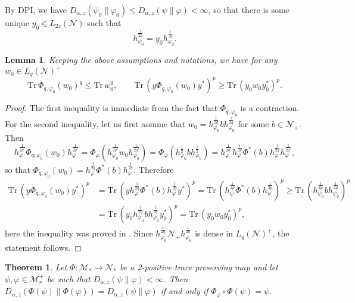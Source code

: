 \documentclass[12pt]{article}
\newtheorem{lemma}{Lemma}
\newtheorem{theorem}{Theorem}
\theoremstyle{definition}
\theoremstyle{remark}
\def\Me{\mathcal M}
\def\Ne{\mathcal N}
\def \Tr{\mathrm{Tr}\,}
\begin{document}
By DPI, we have $D_{\alpha,z}(\psi_0\|\varphi_0)\le D_{\alpha,z}(\psi\|\varphi)<\infty$,
so that there is some unique $y_0\in L_{2z}(\Ne)$ such that 
\[
h_{\psi_0}^{\frac1{2p}}=y_0h_{\varphi_0}^{\frac1{2q}}.
\]

\begin{lemma}\label{lemma:le} Keeping the above assumptions and notations, we have for any $w_0\in
L_q(\Ne)^+$
\[
\Tr\Phi_{q,\varphi_0}(w_0)^q\le \Tr w_0^q,\qquad \Tr(y\Phi_{q,\varphi_0}(w_0)y^*)^p\ge
\Tr (y_0w_0y_0^*)^p.
\]

\end{lemma}

\begin{proof} The first inequality is immediate from the fact that $\Phi_{q,\varphi_0}$ is
a contraction. For the second inequality, let us first assume that
$w_0=h_{\varphi_0}^{\frac1{2q}}bh_{\varphi_0}^{\frac1{2q}}$ for some $b\in \Ne_+$. Then 
\[
h_{\varphi}^{\frac1{2q'}}\Phi_{q,\varphi_0}(w_0)h_{\varphi}^{\frac1{2q'}}=
\Phi_\varphi(h_{\varphi_0}^{\frac1{2q'}}w_0h_{\varphi_0}^{\frac1{2q'}})=\Phi_\varphi(h_{\varphi_0}^{\frac1{2}}bh_{\varphi_0}^{\frac1{2}})=h_{\varphi}^{\frac1{2q'}}h_{\varphi}^{\frac1{2q}}\Phi^*(b)h_{\varphi}^{\frac1{2q}}h_{\varphi}^{\frac1{2q'}},
\]
so that
$\Phi_{q,\varphi_0}(w_0)=h_{\varphi}^{\frac1{2q}}\Phi^*(b)h_{\varphi}^{\frac1{2q}}$.
Therefore
\begin{align*}
\Tr(y\Phi_{q,\varphi_0}(w_0)y^*)^p&=\Tr(yh_{\varphi}^{\frac1{2q}}\Phi^*(b)h_{\varphi}^{\frac1{2q}}y^*)^p=
\Tr(h_\psi^{\frac1{2p}}\Phi^*(b)h_\psi^{\frac1{2p}})^p\ge
\Tr(h_{\psi_0}^{\frac1{2p}}bh_{\psi_0}^{\frac1{2p}})^p\\
&=
\Tr(y_0h_{\varphi_0}^{\frac1{2q}}bh_{\varphi_0}^{\frac1{2q}}y_0^*)^p=\Tr(y_0w_0y_0^*)^p,
\end{align*}
here the inequality was proved in \cite{AJnotes}. Since
$h_{\varphi_0}^{\frac1{2q}}\Ne_+h_{\varphi_0}^{\frac1{2q}}$ is dense in $L_q(\Ne)^+$, the
statement follows.
\end{proof}

\begin{theorem} Let $\Phi:\Me_*\to \Ne_*$ be a 2-positive trace preserving map and let $\psi,\varphi\in \Me_*^+$ be such that
$D_{\alpha,z}(\psi\|\varphi)<\infty$. Then
$D_{\alpha,z}(\Phi(\psi)\|\Phi(\varphi))=D_{\alpha,z}(\psi\|\varphi)$ if and only if
$\Phi_\varphi\circ\Phi(\psi)=\psi$.

\end{theorem}
\end{document}
